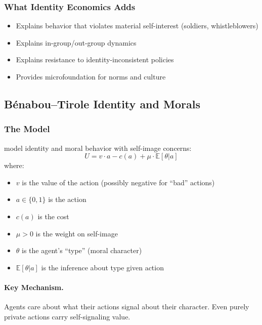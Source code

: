 \documentclass[12pt,a4paper]{article}
\begin{document}
\subsubsection{What Identity Economics Adds}

\begin{itemize}
  \item Explains behavior that violates material self-interest (soldiers, whistleblowers)
  \item Explains in-group/out-group dynamics
  \item Explains resistance to identity-inconsistent policies
  \item Provides microfoundation for norms and culture
\end{itemize}

\subsection{Bénabou--Tirole Identity and Morals}
\label{app:benaboutirole}

\subsubsection{The Model}

\citet{benaboutirole} model identity and moral behavior with self-image concerns:
\begin{equation}
  U = v \cdot a - c(a) + \mu \cdot \mathbb{E}[\theta | a]
  \label{eq:btutility}
\end{equation}
where:
\begin{itemize}
  \item $v$ is the value of the action (possibly negative for ``bad'' actions)
  \item $a \in \{0, 1\}$ is the action
  \item $c(a)$ is the cost
  \item $\mu > 0$ is the weight on self-image
  \item $\theta$ is the agent's ``type'' (moral character)
  \item $\mathbb{E}[\theta | a]$ is the inference about type given action
\end{itemize}

\paragraph{Key Mechanism.}
Agents care about what their actions signal about their character.
Even purely private actions carry self-signaling value.
\end{document}
